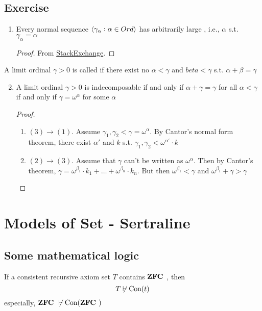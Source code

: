 \documentclass[11pt]{article}
\begin{document}
\subsection{Exercise}
\label{sec:org05f1225}
\begin{enumerate}
\item Every normal sequence \(\langle\gamma_\alpha:\alpha\in Ord\rangle\) has arbitrarily
large , i.e., \(\alpha\) s.t. \(\gamma_\alpha=\alpha\)

\begin{proof}
From
\href{https://math.stackexchange.com/questions/1808103/show-that-there-exists-a-fixed-point-for-this-set-theoretic-class-function}{StackExchange}.
\end{proof}
\end{enumerate}


A limit ordinal \(\gamma>0\) is called  if there exist no
\(\alpha<\gamma\) and \(beta<\gamma\) s.t. \(\alpha+\beta=\gamma\)
\begin{enumerate}
\setcounter{enumi}{1}
\item A limit ordinal \(\gamma>0\) is indecomposable if and only if
\(\alpha+\gamma=\gamma\) for all \(\alpha<\gamma\) if and only if
\(\gamma=\omega^\alpha\) for some \(\alpha\)
\begin{proof}
\begin{enumerate}
\item \((3)\to(1)\). Assume \(\gamma_1,\gamma_2<\gamma=\omega^\alpha\). By
Cantor's normal form theorem, there exist \(\alpha'\) and \(k\) s.t. 
\(\gamma_1,\gamma_2<\omega^{\alpha'}\cdot k\)
\item \((2)\to(3)\). Assume that \(\gamma\) can't be written as \(\omega^\alpha\).
Then by Cantor's theorem, \(\gamma=\omega^{\beta_1}\cdot
         k_1+\dots+\omega^{\beta_n}\cdot k_n\). But then
\(\omega^{\beta_1}<\gamma\) and \(\omega^{\beta_1}+\gamma>\gamma\)
\end{enumerate}
\end{proof}
\end{enumerate}
\section{Models of Set - Sertraline}
\label{sec:org3a0162d}
\subsection{Some mathematical logic}
\label{sec:orgc6b013d}
\begin{theorem}
If a consistent recursive axiom set \(T\) contains \(\textbf{ZFC }\), then
\begin{equation*}
T\not\vdash\text{Con}(t)
\end{equation*}
especially, \(\textbf{ZFC }\not\vdash\text{Con}(\textbf{ZFC })\)
\end{theorem}
\end{document}
